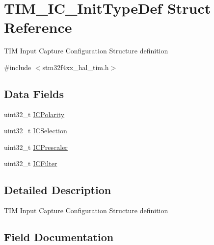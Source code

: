 \hypertarget{struct_t_i_m___i_c___init_type_def}{}\section{T\+I\+M\+\_\+\+I\+C\+\_\+\+Init\+Type\+Def Struct Reference}
\label{struct_t_i_m___i_c___init_type_def}


T\+IM Input Capture Configuration Structure definition ~\newline
  




{\ttfamily \#include $<$stm32f4xx\+\_\+hal\+\_\+tim.\+h$>$}

\subsection*{Data Fields}
\begin{DoxyCompactItemize}
\item 
uint32\+\_\+t \mbox{\hyperlink{struct_t_i_m___i_c___init_type_def_a6c0364c24e89f17849b0109236112fba}{I\+C\+Polarity}}
\item 
uint32\+\_\+t \mbox{\hyperlink{struct_t_i_m___i_c___init_type_def_a280cec08ad0ea4608ae57523775cc1c0}{I\+C\+Selection}}
\item 
uint32\+\_\+t \mbox{\hyperlink{struct_t_i_m___i_c___init_type_def_adc795cd98eeaa7725743856652cd2b4a}{I\+C\+Prescaler}}
\item 
uint32\+\_\+t \mbox{\hyperlink{struct_t_i_m___i_c___init_type_def_ab621c1517d5345834fcc71eea97156bf}{I\+C\+Filter}}
\end{DoxyCompactItemize}


\subsection{Detailed Description}
T\+IM Input Capture Configuration Structure definition ~\newline
 

\subsection{Field Documentation}
\mbox{\label{struct_t_i_m___i_c___init_type_def_ab621c1517d5345834fcc71eea97156bf}} 
